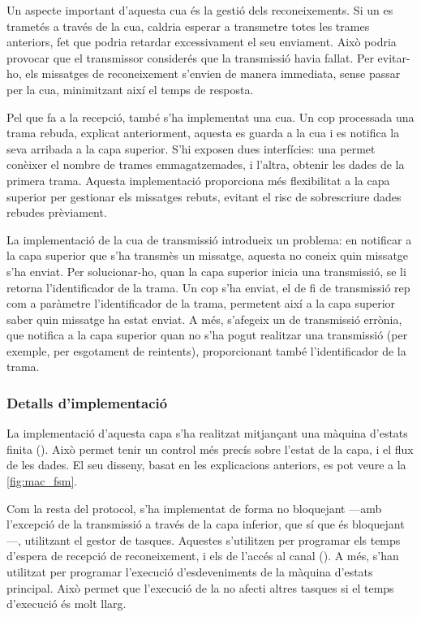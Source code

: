\documentclass{tfgitic}[2024/07/01]
\begin{document}
Un aspecte important d’aquesta cua és la gestió dels reconeixements. Si un  es trametés a través de la cua, caldria esperar a transmetre totes les trames anteriors, fet que podria retardar excessivament el seu enviament. Això podria provocar que el transmissor considerés que la transmissió havia fallat. Per evitar-ho, els missatges de reconeixement s’envien de manera immediata, sense passar per la cua, minimitzant així el temps de resposta.

Pel que fa a la recepció, també s’ha implementat una cua. Un cop processada una trama rebuda, explicat anteriorment, aquesta es guarda a la cua i es notifica la seva arribada a la capa superior. S’hi exposen dues interfícies: una permet conèixer el nombre de trames emmagatzemades, i l’altra, obtenir les dades de la primera trama. Aquesta implementació proporciona més flexibilitat a la capa superior per gestionar els missatges rebuts, evitant el risc de sobrescriure dades rebudes prèviament.

La implementació de la cua de transmissió introdueix un problema: en notificar a la capa superior que s'ha transmès un missatge, aquesta no coneix quin missatge s'ha enviat. Per solucionar-ho, quan la capa superior inicia una transmissió, se li retorna l'identificador de la trama. Un cop s'ha enviat, el  de fi de transmissió rep com a paràmetre l'identificador de la trama, permetent així a la capa superior saber quin missatge ha estat enviat. A més, s'afegeix un  de transmissió errònia, que notifica a la capa superior quan no s'ha pogut realitzar una transmissió (per exemple, per esgotament de reintents), proporcionant també l'identificador de la trama.
\subsubsection{Detalls d'implementació}
La implementació d'aquesta capa s'ha realitzat mitjançant una màquina d'estats finita (). Això permet tenir un control més precís sobre l'estat de la capa, i el flux de les dades. El seu disseny, basat en les explicacions anteriors, es pot veure a la \autoref{fig:mac_fsm}.

Com la resta del protocol, s'ha implementat de forma no bloquejant ---amb l'excepció de la transmissió a través de la capa inferior, que sí que és bloquejant---, utilitzant el gestor de tasques. Aquestes s'utilitzen per programar els temps d'espera de recepció de reconeixement, i els de l'accés al canal (). A més, s'han utilitzat per programar l'execució d'esdeveniments de la màquina d'estats principal. Això permet que l'execució de la  no afecti altres tasques si el temps d'execució és molt llarg.
\end{document}
